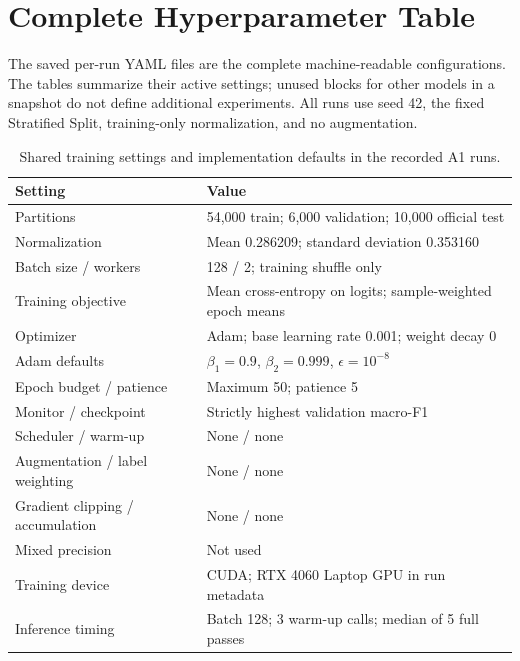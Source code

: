 \section{Complete Hyperparameter Table}
\label{app:hyperparameters}

The saved per-run YAML files are the complete machine-readable configurations. The tables summarize their active settings; unused blocks for other models in a snapshot do not define additional experiments. All runs use seed 42, the fixed Stratified Split, training-only normalization, and no augmentation.

\begin{table}[H]
    \centering
    \caption{Shared training settings and implementation defaults in the recorded A1 runs.}
    \small
    \begin{tabularx}{\textwidth}{@{}lY@{}}
        \toprule
        Setting & Value \\
        \midrule
        Partitions & 54,000 train; 6,000 validation; 10,000 official test \\
        Normalization & Mean 0.286209; standard deviation 0.353160 \\
        Batch size / workers & 128 / 2; training shuffle only \\
        Training objective & Mean cross-entropy on logits; sample-weighted epoch means \\
        Optimizer & Adam; base learning rate 0.001; weight decay 0 \\
        Adam defaults & $\beta_1=0.9$, $\beta_2=0.999$, $\epsilon=10^{-8}$ \\
        Epoch budget / patience & Maximum 50; patience 5 \\
        Monitor / checkpoint & Strictly highest validation macro-F1 \\
        Scheduler / warm-up & None / none \\
        Augmentation / label weighting & None / none \\
        Gradient clipping / accumulation & None / none \\
        Mixed precision & Not used \\
        Training device & CUDA; RTX 4060 Laptop GPU in run metadata \\
        Inference timing & Batch 128; 3 warm-up calls; median of 5 full passes \\
        \bottomrule
    \end{tabularx}
\end{table}

